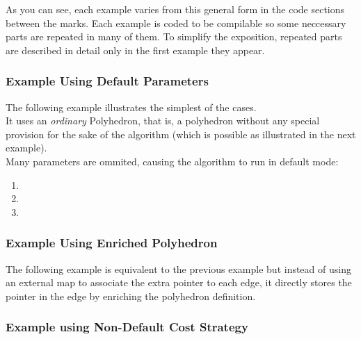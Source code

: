 
As you can see, each example varies from this general form in the code sections between the marks.
Each example is coded to be compilable so some neccessary parts are repeated in many of them. To simplify the exposition, repeated parts are described in detail only in the first example they appear.

\subsubsection{Example Using Default Parameters}

The following example illustrates the simplest of the cases.\\
It uses an {\em ordinary} Polyhedron, that is, a polyhedron without any special provision 
for the sake of the algorithm (which is possible as illustrated in the next example).\\
Many parameters are ommited, causing the algorithm to run in default mode:

\begin{enumerate}
\item {}
\item {}
\item {}
\end{enumerate}


\subsubsection{Example Using Enriched Polyhedron}

The following example is equivalent to the previous example but instead of using an external map to associate the extra pointer to each edge, it directly stores the pointer in the edge by enriching the polyhedron definition.


\subsubsection{Example using Non-Default Cost Strategy}

